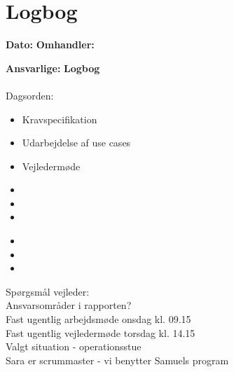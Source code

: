 \chapter{Logbog}

\textbf{Dato:} 
\textbf{Omhandler:} 

\textbf{Ansvarlige:} 
\textbf{Logbog}
\\
\\
Dagsorden:
\begin{itemize}
	\item Kravspecifikation
	\item Udarbejdelse af use cases
	\item Vejledermøde
\end{itemize}


\begin{itemize}
	\item 
	\item 
	\item
\end{itemize}


\begin{itemize}
	\item  
	\item 
	\item 
\end{itemize}

Spørgsmål vejleder: \\
Ansvarsområder i rapporten?\\
Fast ugentlig arbejdsmøde onsdag kl. 09.15\\
Fast ugentlig vejledermøde torsdag kl. 14.15\\

Valgt situation - operationsstue\\
Sara er scrummaster - vi benytter Samuels program\\